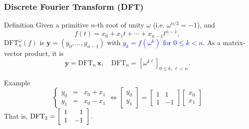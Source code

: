 \begin{frame}
\frametitle{Discrete Fourier Transform (DFT)}



\begin{block}{Definition}
Given a primitive $n$-th root of unity $\omega$ (i.e. $\omega^{n/2} = -1$), 
and $$f(t) = x_0 + x_1t + \cdots + x_{n-1}t^{n-1},$$
${\mathrm{{DFT}}}_n^{\omega}(f) $ is $\mathbf{y} = (y_0, \ldots, y_{n-1})$ with 
\textcolor{blue}{$y_k = f(\omega^{k})$ for $0 \leq k < n$}. 
As a matrix-vector product, it is
\begin{equation}
\mathbf{y} = {\mathrm{DFT}}_n\, \mathbf{x},\quad 
\mathrm{DFT}_n = [\omega^{k\ell}]_{0\leq k,\, \ell < n}. 
\end{equation}
\end{block}


\begin{block}{Example}
$$\left\{ 
    \begin{array}{ccc} 
        y_0 & = & x_0 + x_1 \\ 
        y_1 & = & x_0 - x_1 
  \end{array}\right.
\Longleftrightarrow
\begin{bmatrix} y_0 \\ y_1 \end{bmatrix} 
= \begin{bmatrix} 1 & 1 \\ 1 & -1
\end{bmatrix}
\begin{bmatrix} x_0 \\ x_1 \end{bmatrix}$$
That is, $\mathrm{DFT}_2 = \left[\begin{array}{cr} 1 & 1\\ 1 & -1 \end{array}\right]$.
\end{block}

\end{frame}

